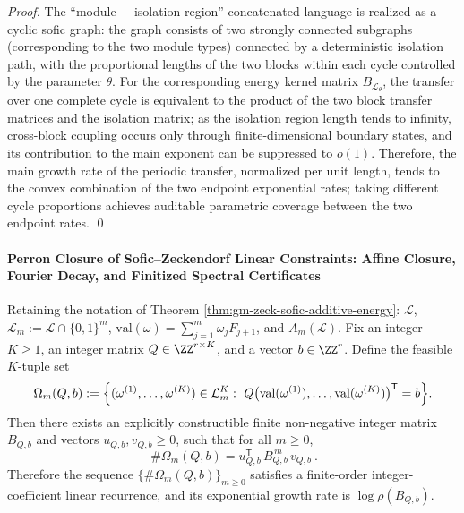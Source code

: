 \begin{proof}
The ``module + isolation region'' concatenated language is realized as a cyclic sofic graph: the graph consists of two strongly connected subgraphs (corresponding to the two module types) connected by a deterministic isolation path, with the proportional lengths of the two blocks within each cycle controlled by the parameter \(\theta\).
For the corresponding energy kernel matrix \(B_{\mathcal{L}_\theta}\), the transfer over one complete cycle is equivalent to the product of the two block transfer matrices and the isolation matrix; as the isolation region length tends to infinity, cross-block coupling occurs only through finite-dimensional boundary states, and its contribution to the main exponent can be suppressed to \(o(1)\).
Therefore, the main growth rate of the periodic transfer, normalized per unit length, tends to the convex combination of the two endpoint exponential rates; taking different cycle proportions achieves auditable parametric coverage between the two endpoint rates. \qed
\end{proof}

\paragraph{Perron Closure of Sofic--Zeckendorf Linear Constraints: Affine Closure, Fourier Decay, and Finitized Spectral Certificates}
\begin{theorem}\label{thm:gm-sofic-zeck-linear-constraints-pf}
Retaining the notation of Theorem \ref{thm:gm-zeck-sofic-additive-energy}: \(\mathcal{L}\), \(\mathcal{L}_m:=\mathcal{L}\cap\{0,1\}^m\), \(\mathrm{val}(\omega)=\sum_{j=1}^{m}\omega_jF_{j+1}\), and \(A_m(\mathcal{L})\).
Fix an integer \(K\ge 1\), an integer matrix \(Q\in\ZZ^{r\times K}\), and a vector \(b\in\ZZ^{r}\).
Define the feasible \(K\)-tuple set
\[
\Omega_m(Q,b)
:=\Bigl\{(\omega^{(1)},\dots,\omega^{(K)})\in \mathcal{L}_m^K:\
Q\bigl(\mathrm{val}(\omega^{(1)}),\dots,\mathrm{val}(\omega^{(K)})\bigr)^{\mathsf T}=b\Bigr\}.
\]
Then there exists an explicitly constructible finite non-negative integer matrix \(B_{Q,b}\) and vectors \(u_{Q,b},v_{Q,b}\ge 0\), such that for all \(m\ge 0\),
\[
\boxed{\ \#\Omega_m(Q,b)=u_{Q,b}^{\mathsf T}\,B_{Q,b}^{\,m}\,v_{Q,b}\ }.
\]
Therefore the sequence \(\{\#\Omega_m(Q,b)\}_{m\ge 0}\) satisfies a finite-order integer-coefficient linear recurrence, and its exponential growth rate is \(\log\rho(B_{Q,b})\).
\end{theorem}

